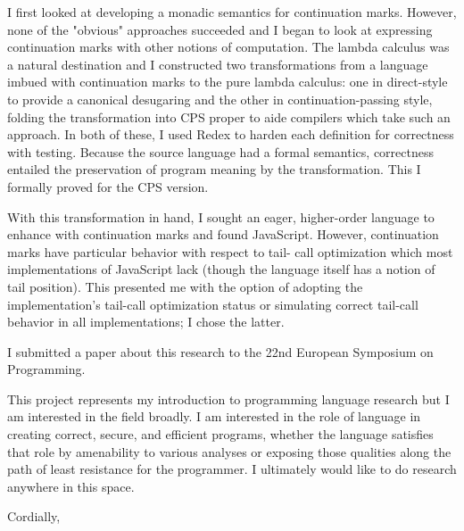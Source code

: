 \documentclass{letter}
\begin{document}
\begin{letter}{}
I first looked at developing a monadic semantics for continuation marks. However, none of the 
"obvious" approaches succeeded and I began to look at expressing continuation marks with other 
notions of computation. The lambda calculus was a natural destination and I constructed two 
transformations from a language imbued with continuation marks to the pure lambda calculus: one 
in direct-style to provide a canonical desugaring and the other in continuation-passing style, 
folding the transformation into CPS proper to aide compilers which take such an approach. In both 
of these, I used Redex to harden each definition for correctness with testing. Because the source language had a formal 
semantics, correctness entailed the preservation of program meaning by the transformation. This 
I formally proved for the CPS version.

With this transformation in hand, I sought an eager, higher-order language to enhance with continuation 
marks and found JavaScript. However, continuation marks have particular behavior with respect to tail-
call optimization which most implementations of JavaScript lack (though the language itself has a 
notion of tail position). This presented me with the option of adopting the implementation's tail-call 
optimization status or simulating correct tail-call behavior in all implementations; I chose the latter.

I submitted a paper about this research to the 22nd European Symposium on Programming.

This project represents my introduction to programming language research but I am interested in the 
field broadly. I am interested in the role of language in creating correct, secure, and efficient 
programs, whether the language satisfies that role by amenability to various analyses or exposing 
those qualities along the path of least resistance for the programmer. I ultimately would like to 
do research anywhere in this space.

\closing{Cordially,}
\end{letter}
\end{document}
